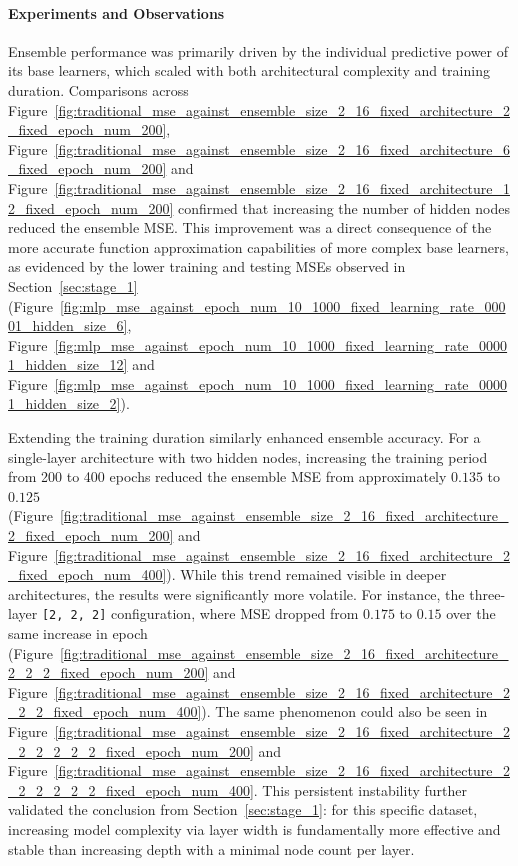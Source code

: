 \documentclass{article}
\begin{document}
\paragraph{Experiments and Observations}
Ensemble performance was primarily driven by the individual predictive power of its base learners, which scaled with both architectural complexity and training duration. Comparisons across Figure~\ref{fig:traditional_mse_against_ensemble_size_2_16_fixed_architecture_2_fixed_epoch_num_200}, Figure~\ref{fig:traditional_mse_against_ensemble_size_2_16_fixed_architecture_6_fixed_epoch_num_200} and Figure~\ref{fig:traditional_mse_against_ensemble_size_2_16_fixed_architecture_12_fixed_epoch_num_200} confirmed that increasing the number of hidden nodes reduced the ensemble MSE. This improvement was a direct consequence of the more accurate function approximation capabilities of more complex base learners, as evidenced by the lower training and testing MSEs observed in Section~\ref{sec:stage_1} (Figure~\ref{fig:mlp_mse_against_epoch_num_10_1000_fixed_learning_rate_00001_hidden_size_6}, Figure~\ref{fig:mlp_mse_against_epoch_num_10_1000_fixed_learning_rate_00001_hidden_size_12} and Figure~\ref{fig:mlp_mse_against_epoch_num_10_1000_fixed_learning_rate_00001_hidden_size_2}). 

Extending the training duration similarly enhanced ensemble accuracy. For a single-layer architecture with two hidden nodes, increasing the training period from 200 to 400 epochs reduced the ensemble MSE from approximately $0.135$ to $0.125$ (Figure~\ref{fig:traditional_mse_against_ensemble_size_2_16_fixed_architecture_2_fixed_epoch_num_200} and Figure~\ref{fig:traditional_mse_against_ensemble_size_2_16_fixed_architecture_2_fixed_epoch_num_400}). While this trend remained visible in deeper architectures, the results were significantly more volatile. For instance, the three-layer \texttt{[2, 2, 2]} configuration, where MSE dropped from $0.175$ to $0.15$ over the same increase in epoch (Figure~\ref{fig:traditional_mse_against_ensemble_size_2_16_fixed_architecture_2_2_2_fixed_epoch_num_200} and Figure~\ref{fig:traditional_mse_against_ensemble_size_2_16_fixed_architecture_2_2_2_fixed_epoch_num_400}). The same phenomenon could also be seen in Figure~\ref{fig:traditional_mse_against_ensemble_size_2_16_fixed_architecture_2_2_2_2_2_2_fixed_epoch_num_200} and Figure~\ref{fig:traditional_mse_against_ensemble_size_2_16_fixed_architecture_2_2_2_2_2_2_fixed_epoch_num_400}. This persistent instability further validated the conclusion from Section~\ref{sec:stage_1}: for this specific dataset, increasing model complexity via layer width is fundamentally more effective and stable than increasing depth with a minimal node count per layer. 
\end{document}
